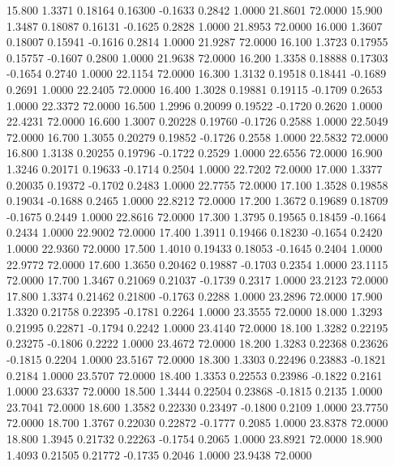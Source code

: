   15.800   1.3371   0.18164   0.16300  -0.1633   0.2842   1.0000  21.8601  72.0000
  15.900   1.3487   0.18087   0.16131  -0.1625   0.2828   1.0000  21.8953  72.0000
  16.000   1.3607   0.18007   0.15941  -0.1616   0.2814   1.0000  21.9287  72.0000
  16.100   1.3723   0.17955   0.15757  -0.1607   0.2800   1.0000  21.9638  72.0000
  16.200   1.3358   0.18888   0.17303  -0.1654   0.2740   1.0000  22.1154  72.0000
  16.300   1.3132   0.19518   0.18441  -0.1689   0.2691   1.0000  22.2405  72.0000
  16.400   1.3028   0.19881   0.19115  -0.1709   0.2653   1.0000  22.3372  72.0000
  16.500   1.2996   0.20099   0.19522  -0.1720   0.2620   1.0000  22.4231  72.0000
  16.600   1.3007   0.20228   0.19760  -0.1726   0.2588   1.0000  22.5049  72.0000
  16.700   1.3055   0.20279   0.19852  -0.1726   0.2558   1.0000  22.5832  72.0000
  16.800   1.3138   0.20255   0.19796  -0.1722   0.2529   1.0000  22.6556  72.0000
  16.900   1.3246   0.20171   0.19633  -0.1714   0.2504   1.0000  22.7202  72.0000
  17.000   1.3377   0.20035   0.19372  -0.1702   0.2483   1.0000  22.7755  72.0000
  17.100   1.3528   0.19858   0.19034  -0.1688   0.2465   1.0000  22.8212  72.0000
  17.200   1.3672   0.19689   0.18709  -0.1675   0.2449   1.0000  22.8616  72.0000
  17.300   1.3795   0.19565   0.18459  -0.1664   0.2434   1.0000  22.9002  72.0000
  17.400   1.3911   0.19466   0.18230  -0.1654   0.2420   1.0000  22.9360  72.0000
  17.500   1.4010   0.19433   0.18053  -0.1645   0.2404   1.0000  22.9772  72.0000
  17.600   1.3650   0.20462   0.19887  -0.1703   0.2354   1.0000  23.1115  72.0000
  17.700   1.3467   0.21069   0.21037  -0.1739   0.2317   1.0000  23.2123  72.0000
  17.800   1.3374   0.21462   0.21800  -0.1763   0.2288   1.0000  23.2896  72.0000
  17.900   1.3320   0.21758   0.22395  -0.1781   0.2264   1.0000  23.3555  72.0000
  18.000   1.3293   0.21995   0.22871  -0.1794   0.2242   1.0000  23.4140  72.0000
  18.100   1.3282   0.22195   0.23275  -0.1806   0.2222   1.0000  23.4672  72.0000
  18.200   1.3283   0.22368   0.23626  -0.1815   0.2204   1.0000  23.5167  72.0000
  18.300   1.3303   0.22496   0.23883  -0.1821   0.2184   1.0000  23.5707  72.0000
  18.400   1.3353   0.22553   0.23986  -0.1822   0.2161   1.0000  23.6337  72.0000
  18.500   1.3444   0.22504   0.23868  -0.1815   0.2135   1.0000  23.7041  72.0000
  18.600   1.3582   0.22330   0.23497  -0.1800   0.2109   1.0000  23.7750  72.0000
  18.700   1.3767   0.22030   0.22872  -0.1777   0.2085   1.0000  23.8378  72.0000
  18.800   1.3945   0.21732   0.22263  -0.1754   0.2065   1.0000  23.8921  72.0000
  18.900   1.4093   0.21505   0.21772  -0.1735   0.2046   1.0000  23.9438  72.0000
